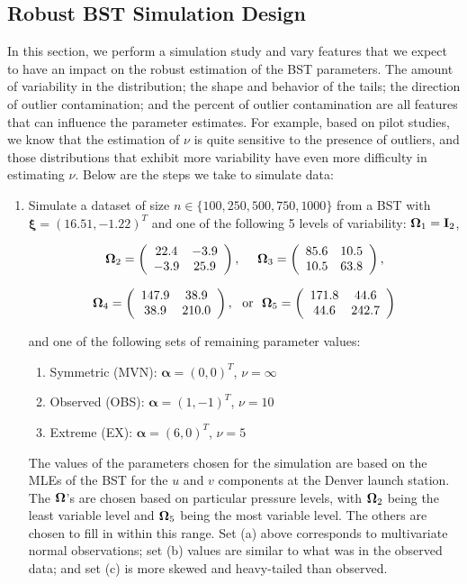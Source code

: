 \documentclass[12pt]{article}
\def\balpha{{\boldsymbol \alpha}}
\def\balpha{{\boldsymbol \alpha}}
\def\bxi{{\boldsymbol \xi}}
\def\bOmega{{\ensuremath\boldsymbol{\Omega}}}
\def\bOmega{{\ensuremath\boldsymbol{\Omega}}}
\begin{document}
\begin{doublespacing}
\subsection{Robust BST Simulation Design}\label{sec:ksim}
In this section, we perform a simulation study and vary features that we expect to have an impact on the robust estimation of the BST parameters.  The amount of variability in the distribution; the shape and behavior of the tails; the direction of outlier contamination; and the percent of outlier contamination are all features that can influence the parameter estimates.  For example, based on pilot studies, we know that the estimation of $\nu$ is quite sensitive to the presence of outliers, and those distributions that exhibit more variability have even more difficulty in estimating $\nu$.     Below are the steps we take to simulate data:


\begin{enumerate}
\item Simulate  a dataset of size $n\in\{100, 250, 500, 750, 1000\}$ from a BST with $\bxi = (16.51,-1.22)^T$ and one of the following 5 levels of variability:  $\bOmega_1 =\mathbf{I}_2$,
    
   $$\bOmega_2 = \left(\begin{array}{cc}
    22.4 & -3.9\\
    -3.9 & 25.9 \end{array} \right),   \,\,\,\,\,\,\,\, \bOmega_3 = \left(\begin{array}{cc}
    85.6 & 10.5\\
    10.5 & 63.8 \end{array} \right),   $$ 
 
 $$ \bOmega_4 = \left(\begin{array}{cc}
    147.9 & 38.9\\
    38.9 & 210.0 \end{array} \right),  \,\,\,\,\mbox{or}\,\,\,\,  \bOmega_5 = \left(\begin{array}{cc}
    171.8 & 44.6\\
    44.6 & 242.7 \end{array} \right)$$ 
 
   
    
    and one of the following sets of remaining parameter values:
\begin{enumerate}
\item Symmetric (MVN):  $\balpha=(0,0)^T$, $\nu=\infty$
\item Observed (OBS):  $\balpha=(1,-1)^T$, $\nu=10$
\item Extreme (EX): $\balpha=(6,0)^T$, $\nu=5$
\end{enumerate}
The values of the parameters chosen for the simulation are  based on the MLEs of the BST for the $u$ and $v$ components at the Denver launch station.  The $\bOmega$'s are chosen based on particular pressure levels, with $\bOmega_2$ being the least variable level and $\bOmega_5$ being the most variable level.  The others are chosen to fill in within this range.   Set (a) above corresponds to multivariate normal observations; set (b) values are similar to what was in the observed data; and set (c) is more skewed and heavy-tailed than observed.  


\end{enumerate}
\end{doublespacing}
\end{document}
